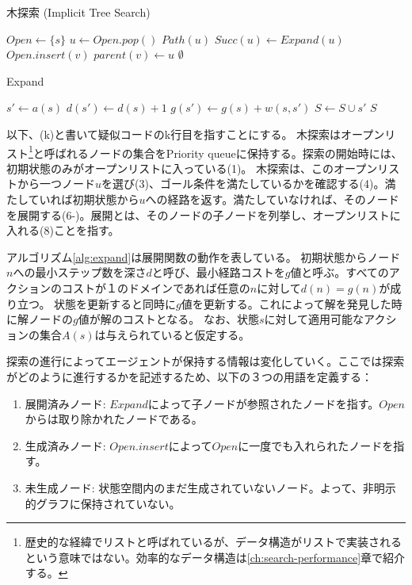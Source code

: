 \begin{algorithm}[h]
\caption{木探索 (Implicit Tree Search)}
\label{alg:implicit-tree-search}
	$Open \leftarrow \{s\}$\;
	 {
		$u \leftarrow Open.pop()$\;
		 {
			\Return $Path(u)$\;
		}
		$Succ(u) \leftarrow Expand(u)$\;
		 {
			$Open.insert(v)$\;
			$parent(v) \leftarrow u$\;
		}
 	}
	\Return $\emptyset$\;
\end{algorithm}

\begin{algorithm}[H]%
\caption{Expand}%
\label{alg:expand}
	 {
		$s' \leftarrow a(s)$\;
		$d(s') \leftarrow d(s) + 1$\;
		$g(s') \leftarrow g(s) + w(s, s')$\;
		$S \leftarrow S \cup {s'}$\;
	}
	\Return $S$\;
\end{algorithm}
    

以下、(k)と書いて疑似コードのk行目を指すことにする。
木探索はオープンリスト\footnote{歴史的な経緯でリストと呼ばれているが、データ構造がリストで実装されるという意味ではない。効率的なデータ構造は\ref{ch:search-performance}章で紹介する。}と呼ばれるノードの集合をPriority queueに保持する。探索の開始時には、初期状態のみがオープンリストに入っている(1)。
木探索は、このオープンリストから一つノード$u$を選び(3)、ゴール条件を満たしているかを確認する(4)。満たしていれば初期状態から$u$への経路を返す。満たしていなければ、そのノードを展開する(6-)。展開とは、そのノードの子ノードを列挙し、オープンリストに入れる(8)ことを指す。

アルゴリズム\ref{alg:expand}は展開関数の動作を表している。
初期状態からノード$n$への最小ステップ数を深さ$d$と呼び、最小経路コストを$g$値と呼ぶ。すべてのアクションのコストが１のドメインであれば任意の$n$に対して$d(n) = g(n)$が成り立つ。
状態を更新すると同時に$g$値を更新する。これによって解を発見した時に解ノードの$g$値が解のコストとなる。
なお、状態$s$に対して適用可能なアクションの集合$A(s)$は与えられていると仮定する。

探索の進行によってエージェントが保持する情報は変化していく。ここでは探索がどのように進行するかを記述するため、以下の３つの用語を定義する：

\begin{enumerate}
\item 展開済みノード: $Expand$によって子ノードが参照されたノードを指す。$Open$からは取り除かれたノードである。
\item 生成済みノード: $Open.insert$によって$Open$に一度でも入れられたノードを指す。
\item 未生成ノード: 状態空間内のまだ生成されていないノード。よって、非明示的グラフに保持されていない。
\end{enumerate}

